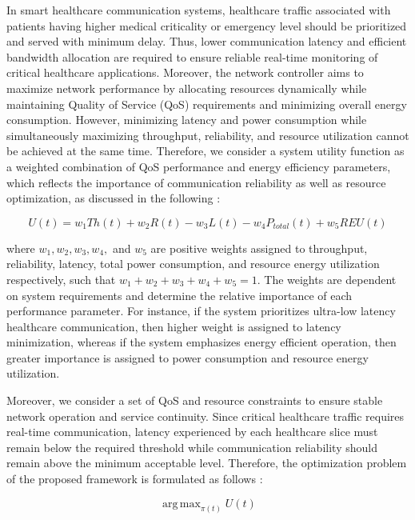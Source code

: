 \documentclass[10pt,journal,compsoc]{IEEEtran}
\DeclareMathOperator*{\argmax}{arg\,max}
\begin{document}
In smart healthcare communication systems, healthcare traffic associated with patients having higher medical criticality or emergency level should be prioritized and served with minimum delay. Thus, lower communication latency and efficient bandwidth allocation are required to ensure reliable real-time monitoring of critical healthcare applications. Moreover, the network controller aims to maximize network performance by allocating resources dynamically while maintaining Quality of Service (QoS) requirements and minimizing overall energy consumption. However, minimizing latency and power consumption while simultaneously maximizing throughput, reliability, and resource utilization cannot be achieved at the same time. Therefore, we consider a system utility function as a weighted combination of QoS performance and energy efficiency parameters, which reflects the importance of communication reliability as well as resource optimization, as discussed in the following \cite{saleh2025hybridrl,tariq2025ddpgv2x,kumar2025lstmddpg}:

\begin{equation}\label{UtilityFunction}
U(t)=w_1Th(t)+w_2R(t)-w_3L(t)-w_4P_{total}(t)+w_5REU(t)
\end{equation}

where $w_1,w_2,w_3,w_4,$ and $w_5$ are positive weights assigned to throughput, reliability, latency, total power consumption, and resource energy utilization respectively, such that $w_1+w_2+w_3+w_4+w_5=1$. The weights are dependent on system requirements and determine the relative importance of each performance parameter. For instance, if the system prioritizes ultra-low latency healthcare communication, then higher weight is assigned to latency minimization, whereas if the system emphasizes energy efficient operation, then greater importance is assigned to power consumption and resource energy utilization.

Moreover, we consider a set of QoS and resource constraints to ensure stable network operation and service continuity. Since critical healthcare traffic requires real-time communication, latency experienced by each healthcare slice must remain below the required threshold while communication reliability should remain above the minimum acceptable level. Therefore, the optimization problem of the proposed framework is formulated as follows \cite{saleh2025hybridrl,tariq2025ddpgv2x}:

\begin{equation}\label{OptimizationProblem}
\argmax_{\pi(t)} U(t)
\end{equation}
\end{document}
